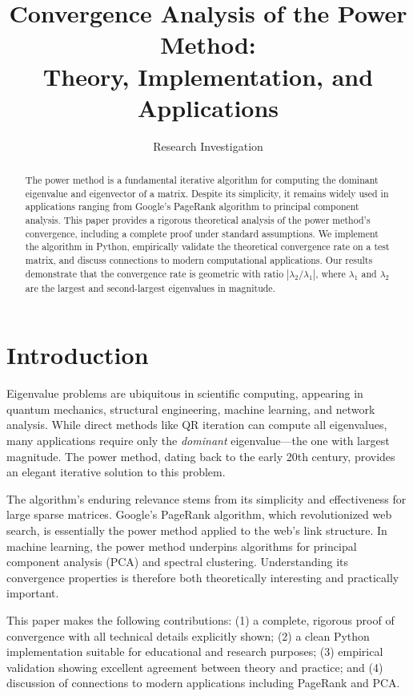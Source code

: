 \documentclass[11pt,a4paper]{article}
\title{\textbf{Convergence Analysis of the Power Method:\\Theory, Implementation, and Applications}}
\author{Research Investigation}
\date{}
\begin{document}
\maketitle

\begin{abstract}
The power method is a fundamental iterative algorithm for computing the dominant eigenvalue and eigenvector of a matrix. Despite its simplicity, it remains widely used in applications ranging from Google's PageRank algorithm to principal component analysis. This paper provides a rigorous theoretical analysis of the power method's convergence, including a complete proof under standard assumptions. We implement the algorithm in Python, empirically validate the theoretical convergence rate on a test matrix, and discuss connections to modern computational applications. Our results demonstrate that the convergence rate is geometric with ratio $|\lambda_2/\lambda_1|$, where $\lambda_1$ and $\lambda_2$ are the largest and second-largest eigenvalues in magnitude.
\end{abstract}

\section{Introduction}

Eigenvalue problems are ubiquitous in scientific computing, appearing in quantum mechanics, structural engineering, machine learning, and network analysis. While direct methods like QR iteration can compute all eigenvalues, many applications require only the \emph{dominant} eigenvalue—the one with largest magnitude. The power method, dating back to the early 20th century, provides an elegant iterative solution to this problem.

The algorithm's enduring relevance stems from its simplicity and effectiveness for large sparse matrices. Google's PageRank algorithm, which revolutionized web search, is essentially the power method applied to the web's link structure. In machine learning, the power method underpins algorithms for principal component analysis (PCA) and spectral clustering. Understanding its convergence properties is therefore both theoretically interesting and practically important.

This paper makes the following contributions: (1) a complete, rigorous proof of convergence with all technical details explicitly shown; (2) a clean Python implementation suitable for educational and research purposes; (3) empirical validation showing excellent agreement between theory and practice; and (4) discussion of connections to modern applications including PageRank and PCA.
\end{document}
